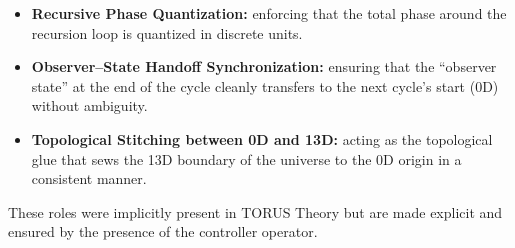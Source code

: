 \documentclass[
]{article}
\begin{document}
\begin{itemize}
\item
  \textbf{Recursive Phase Quantization:} enforcing that the total phase
  around the recursion loop is quantized in discrete units.
\item
  \textbf{Observer--State Handoff Synchronization:} ensuring that the
  ``observer state'' at the end of the cycle cleanly transfers to the
  next cycle's start (0D) without ambiguity.
\item
  \textbf{Topological Stitching between 0D and 13D:} acting as the
  topological glue that sews the 13D boundary of the universe to the 0D
  origin in a consistent manner.
\end{itemize}

These roles were implicitly present in TORUS Theory but are made
explicit and ensured by the presence of the controller operator.
\end{document}
